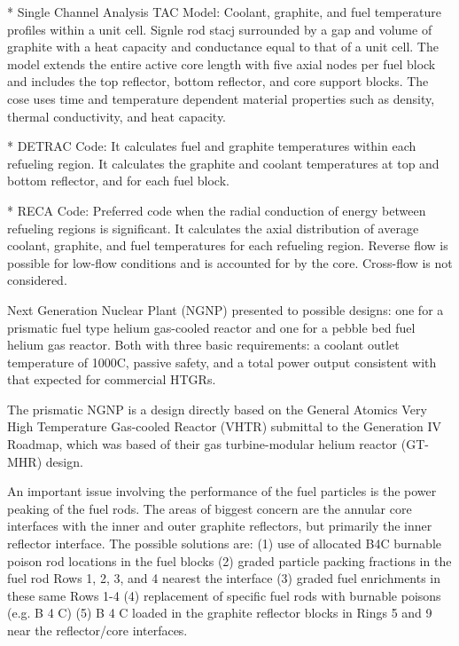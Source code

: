 * Single Channel Analysis TAC Model:
Coolant, graphite, and fuel temperature profiles within a unit cell.
Signle rod stacj surrounded by a gap and volume of graphite with a heat capacity and conductance equal to that of a unit cell.
The model extends the entire active core length with five axial nodes per fuel block and includes the top reflector, bottom reflector, and core support blocks.
The cose uses time and temperature dependent material properties such as density, thermal conductivity, and heat capacity.

* DETRAC Code:
It calculates fuel and graphite temperatures within each refueling region.
It calculates the graphite and coolant temperatures at top and bottom reflector, and for each fuel block.

* RECA Code:
Preferred code when the radial conduction of energy between refueling regions is significant.
It calculates the axial distribution of average coolant, graphite, and fuel temperatures for each refueling region.
Reverse flow is possible for low-flow conditions and is accounted for by the core.
Cross-flow is not considered.

Next Generation Nuclear Plant (NGNP) presented to possible designs: one for a prismatic fuel type helium gas-cooled reactor and one for a pebble bed fuel helium gas reactor.
Both with three basic requirements: a coolant outlet temperature of 1000C, passive safety, and a total power output consistent with that expected for commercial HTGRs.

The prismatic NGNP is a design directly based on the General Atomics Very High Temperature Gas-cooled Reactor (VHTR) submittal to the Generation IV Roadmap, which was based of their gas turbine-modular helium reactor (GT-MHR) design.

An important issue involving the performance of the fuel particles is the power peaking of the fuel rods.
The areas of biggest concern are the annular core interfaces with the inner and outer graphite reflectors, but primarily the inner reflector interface.
The possible solutions are:
(1) use of allocated B4C burnable poison rod locations in the fuel blocks
(2) graded particle packing fractions in the fuel rod Rows 1, 2, 3, and 4 nearest the interface
(3) graded fuel enrichments in these same Rows 1-4
(4) replacement of specific fuel rods with burnable poisons (e.g. B 4 C)
(5) B 4 C loaded in the graphite reflector blocks in Rings 5 and 9 near the reflector/core interfaces.

